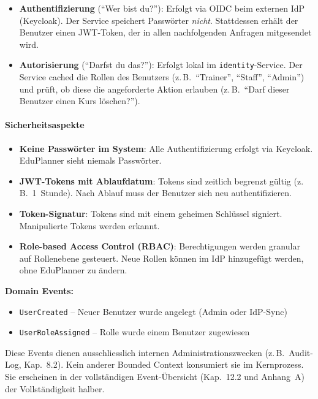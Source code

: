 \begin{itemize}[leftmargin=1.5em]
  \item \textbf{Authentifizierung} (``Wer bist du?''):
  Erfolgt via OIDC beim externen IdP (Keycloak).
  Der Service speichert Passwörter \emph{nicht}.
  Stattdessen erhält der Benutzer einen JWT-Token,
  der in allen nachfolgenden Anfragen mitgesendet wird.
  \item \textbf{Autorisierung} (``Darfst du das?''):
  Erfolgt lokal im \texttt{identity}-Service.
  Der Service cached die Rollen des Benutzers
  (z.\,B.\ ``Trainer'', ``Staff'', ``Admin'') und
  prüft, ob diese die angeforderte Aktion erlauben
  (z.\,B.\ ``Darf dieser Benutzer einen Kurs
  löschen?'').
\end{itemize}

\paragraph{Sicherheitsaspekte}

\begin{itemize}[leftmargin=1.5em]
  \item \textbf{Keine Passwörter im System}: Alle
  Authentifizierung erfolgt via Keycloak. EduPlanner
  sieht niemals Passwörter.
  \item \textbf{JWT-Tokens mit Ablaufdatum}: Tokens sind
  zeitlich begrenzt gültig (z.\,B.\ 1~Stunde).
  Nach Ablauf muss der Benutzer sich neu
  authentifizieren.
  \item \textbf{Token-Signatur}: Tokens sind mit einem
  geheimen Schlüssel signiert. Manipulierte Tokens
  werden erkannt.
  \item \textbf{Role-based Access Control (RBAC)}:
  Berechtigungen werden granular auf Rollenebene
  gesteuert. Neue Rollen können im IdP hinzugefügt
  werden, ohne EduPlanner zu ändern.
\end{itemize}

\noindent\textbf{Domain Events:}
\begin{itemize}[leftmargin=1.5em, label=\raisebox{0.25ex}{\tiny\(\bullet\)}]
  \item \texttt{UserCreated} -- Neuer Benutzer wurde angelegt (Admin oder IdP-Sync)
  \item \texttt{UserRoleAssigned} -- Rolle wurde einem Benutzer zugewiesen
\end{itemize}

\begin{hinweis}
  Diese Events dienen ausschliesslich internen Administrationszwecken
  (z.\,B.\ Audit-Log, Kap.~8.2). Kein anderer Bounded Context konsumiert
  sie im Kernprozess. Sie erscheinen in der vollständigen Event-Übersicht
  (Kap.~12.2 und Anhang~A) der Vollständigkeit halber.
\end{hinweis}
